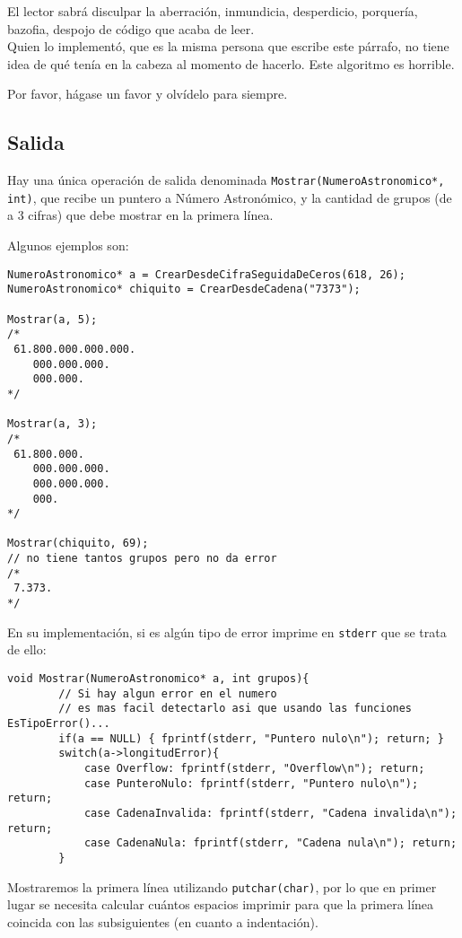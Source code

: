 \documentclass[a4paper, 12pt]{article}
\begin{document}
El lector sabrá disculpar la aberración, inmundicia, desperdicio, porquería, bazofia, despojo de código que acaba de leer.\\
Quien lo implementó, que es la misma persona que escribe este párrafo, no tiene idea de qué tenía en la cabeza al momento de hacerlo. Este algoritmo es horrible.

Por favor, hágase un favor y olvídelo para siempre.

\subsection{Salida}\label{salida}
\bigbreak
Hay una única operación de salida denominada \verb|Mostrar(NumeroAstronomico*, int)|, que recibe un puntero a Número Astronómico, y la cantidad de grupos (de a 3 cifras) que debe mostrar en la primera línea.

Algunos ejemplos son:

\begin{lstlisting}[style=C]
NumeroAstronomico* a = CrearDesdeCifraSeguidaDeCeros(618, 26);
NumeroAstronomico* chiquito = CrearDesdeCadena("7373");

Mostrar(a, 5);
/*
 61.800.000.000.000.
    000.000.000.
    000.000.
*/

Mostrar(a, 3);
/*
 61.800.000.
    000.000.000.
    000.000.000.
    000.
*/

Mostrar(chiquito, 69);
// no tiene tantos grupos pero no da error
/*
 7.373.
*/
\end{lstlisting}

En su implementación, si es algún tipo de error imprime en \texttt{stderr} que se trata de ello:

\begin{lstlisting}[style=C]
    void Mostrar(NumeroAstronomico* a, int grupos){
        // Si hay algun error en el numero
        // es mas facil detectarlo asi que usando las funciones EsTipoError()...
        if(a == NULL) { fprintf(stderr, "Puntero nulo\n"); return; }
        switch(a->longitudError){
            case Overflow: fprintf(stderr, "Overflow\n"); return;
            case PunteroNulo: fprintf(stderr, "Puntero nulo\n"); return;
            case CadenaInvalida: fprintf(stderr, "Cadena invalida\n"); return;
            case CadenaNula: fprintf(stderr, "Cadena nula\n"); return;
        }
\end{lstlisting}

Mostraremos la primera línea utilizando \texttt{putchar(char)}, por lo que en primer lugar se necesita calcular cuántos espacios imprimir para que la primera línea coincida con las subsiguientes (en cuanto a indentación).
\end{document}
